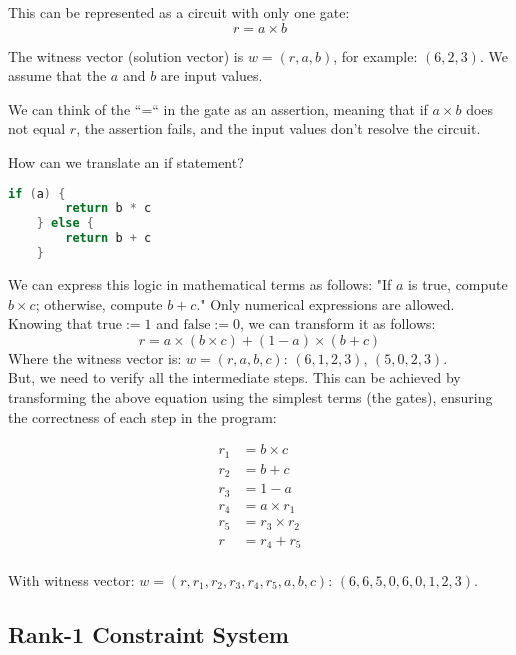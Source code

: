 \documentclass[../lecture-notes.tex]{subfiles}
\begin{document}
This can be represented as a circuit with only one gate:
\[ r = a \times b \]

The witness vector (solution vector) is $w = (r, a, b)$, for example: $(6, 2, 3)$. We 
assume that the $a$ and $b$ are input values. 

We can think of the ``=`` in the gate as an assertion, meaning that if $a \times b$ does not equal
$r$, the assertion fails, and the input values don't resolve the circuit.

How can we translate an if statement?

\begin{lstlisting}[language=C,numbers=none]
    if (a) {
        return b * c
    } else {
        return b + c
    }
\end{lstlisting}

We can express this logic in mathematical terms as follows: "If $a$ is true, compute 
$b \times c$; otherwise, compute $b + c$." Only numerical expressions are allowed. Knowing that
$\text{true} := 1$ and $\text{false} := 0$, we can transform it as follows:
\[ r = a \times (b \times c) + (1 - a) \times (b + c) \]
Where the witness vector is: $w = (r, a , b, c)$: $(6, 1, 2, 3)$, $(5, 0, 2, 3)$.\\

But, we need to verify all the intermediate steps. This can be achieved by transforming the above
equation using the simplest terms (the gates), ensuring the correctness of each step in the program: 

\begin{equation*}
    \begin{aligned}
        r_1 &= b \times c \\
        r_2 &= b + c \\
        r_3 &= 1 - a \\
        r_4 &= a \times r_1 \\
        r_5 &= r_3 \times r_2 \\
        r &= r_4 + r_5 \\
    \end{aligned}
\end{equation*}

With witness vector: $w = (r, r_1, r_2, r_3, r_4, r_5, a , b, c)$: $(6, 6, 5, 0, 6, 0, 1, 2, 3)$.

\subsection{Rank-1 Constraint System}
\end{document}
